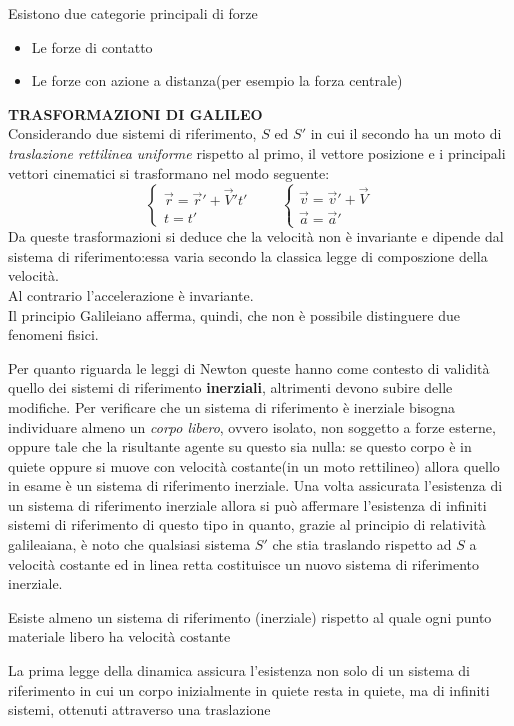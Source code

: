 Esistono due categorie principali di forze
\begin{itemize}
    \item Le forze di contatto
    \item Le forze con azione a distanza(per esempio la forza centrale)
\end{itemize}
\textbf{TRASFORMAZIONI DI GALILEO} \\
Considerando due sistemi di riferimento, $S $ ed $S'$ in cui il secondo ha un moto 
di \emph{traslazione rettilinea uniforme} rispetto al primo, il vettore posizione e i principali
vettori cinematici si trasformano nel modo seguente:
\[
\begin{cases}
     \vec{r} = \vec{r}' + \vec{V}'  t' \\
     t = t'
\end{cases} 
\qquad 
\begin{cases}
     \vec{v} = \vec{v}' + \vec{V} \\
     \vec{a} = \vec{a}'
\end{cases}    
\]
Da queste trasformazioni si deduce che la velocità non è invariante e dipende dal sistema di 
riferimento:essa varia secondo la classica legge di composzione della velocità. \\
Al contrario l'accelerazione è invariante. \\
Il principio Galileiano afferma, quindi, che non è possibile distinguere due fenomeni fisici. 

Per quanto riguarda le leggi di Newton queste hanno come contesto di validità quello dei sistemi di
riferimento \textbf{inerziali}, altrimenti devono subire delle modifiche.
Per verificare che un sistema di riferimento è inerziale bisogna individuare almeno un \emph{corpo
libero}, ovvero isolato, non soggetto a forze esterne, oppure tale che la risultante agente su
questo sia nulla: se questo corpo è in quiete oppure si muove con velocità costante(in un moto rettilineo)
allora quello in esame è un sistema di riferimento inerziale.
Una volta assicurata l'esistenza di un sistema di riferimento inerziale allora si può affermare l'esistenza
di infiniti sistemi di riferimento di questo tipo in quanto, grazie al principio di relatività galileaiana,
è noto che qualsiasi sistema $S'$ che stia traslando rispetto ad $S$ a velocità costante ed in linea retta
costituisce un nuovo sistema di riferimento inerziale.

\begin{legge}
    Esiste almeno un sistema di riferimento (inerziale) rispetto al quale ogni punto 
    materiale libero ha velocità costante
\end{legge}
La prima legge della dinamica assicura l'esistenza non solo di un sistema di riferimento 
in cui un corpo inizialmente in quiete resta in quiete, ma di infiniti sistemi, ottenuti
attraverso una traslazione


